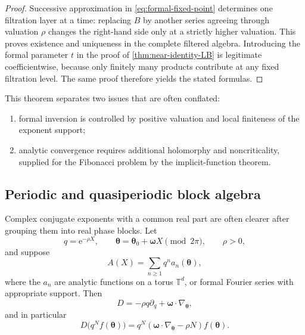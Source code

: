 \documentclass[11pt,oneside]{article}
\numberwithin{equation}{section}
\newcommand{\e}{\mathrm{e}}
\newcommand{\TT}{\mathbb{T}}
\newcommand{\vct}[1]{\boldsymbol{#1}}
\begin{document}
\begin{proof}
Successive approximation in \cref{eq:formal-fixed-point} determines one
filtration layer at a time: replacing \(B\) by another series agreeing through
valuation \(\rho\) changes the right-hand side only at a strictly higher
valuation.  This proves existence and uniqueness in the complete filtered
algebra.  Introducing the formal parameter \(t\) in the proof of
\cref{thm:near-identity-LB} is legitimate coefficientwise, because only
finitely many products contribute at any fixed filtration level.  The same
proof therefore yields the stated formulas.
\end{proof}

This theorem separates two issues that are often conflated:
\begin{enumerate}
  \item formal inversion is controlled by positive valuation and local
        finiteness of the exponent support;
  \item analytic convergence requires additional holomorphy and noncriticality,
        supplied for the Fibonacci problem by the implicit-function theorem.
\end{enumerate}

\subsection{Periodic and quasiperiodic block algebra}

Complex conjugate exponents with a common real part are often clearer after
grouping them into real phase blocks.  Let
\begin{equation}
  q=\e^{-\rho X},
  \qquad
  \vct\theta=\vct\theta_0+\vct\omega X\pmod{2\pi},
  \qquad \rho>0,
  \label{eq:q-torus}
\end{equation}
and suppose
\begin{equation}
  A(X)=\sum_{n\ge1}q^na_n(\vct\theta),
  \label{eq:A-block-general}
\end{equation}
where the \(a_n\) are analytic functions on a torus \(\TT^d\), or formal
Fourier series with appropriate support.  Then
\begin{equation}
  D=-\rho q\partial_q+\vct\omega\cdot\nabla_{\vct\theta},
  \label{eq:D-torus}
\end{equation}
and in particular
\begin{equation}
  D\bigl(q^Nf(\vct\theta)\bigr)
  =q^N\left(\vct\omega\cdot\nabla_{\vct\theta}-\rho N\right)
  f(\vct\theta).
  \label{eq:D-block}
\end{equation}
\end{document}
